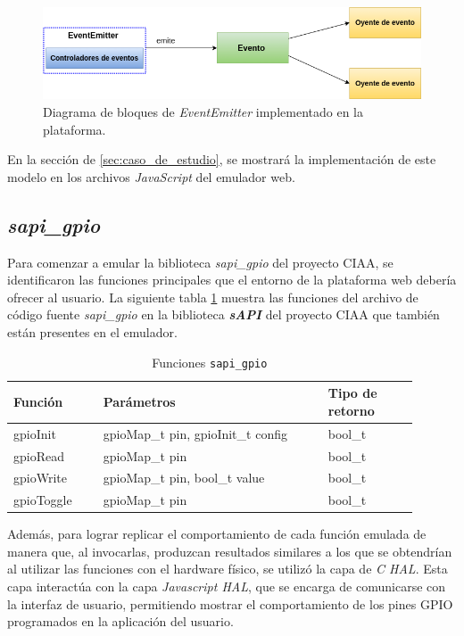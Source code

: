 \begin{figure}[ht]
	\centering
	\includegraphics[scale=.49]{./Figures/EventemitterNodejs.png}
	\caption{Diagrama de bloques de \textit{EventEmitter} implementado en la plataforma.}
	\label{fig:EventemitterNodejs}
\end{figure}

En la sección de \ref{sec:caso_de_estudio}, se mostrará la implementación de este modelo en los archivos \textit{JavaScript} del emulador web.

\subsection{\textit{\textbf{sapi\_gpio}}}

Para comenzar a emular la biblioteca \textit{sapi\_gpio} del proyecto CIAA, se identificaron las funciones principales que el entorno de la plataforma web debería ofrecer al usuario. La siguiente tabla \ref{tab:sapiGPIO} muestra las funciones del archivo de código fuente \textit{sapi\_gpio} en la biblioteca \textit{\textbf{sAPI}} del proyecto CIAA que también están presentes en el emulador.

\begin{table}[h]
	\centering
	\caption[Funciones \texttt{sapi\_gpio}]{Funciones \texttt{sapi\_gpio}}
	\begin{tabular}{p{0.20\linewidth} p{0.50\linewidth}  p{0.20\linewidth}}    
		\toprule
		\textbf{Función} 	 & \textbf{Parámetros} 		& \textbf{Tipo de retorno}  \\
		\midrule
		gpioInit & gpioMap\_t pin, gpioInit\_t config 		&  bool\_t \\		
		gpioRead	 & gpioMap\_t pin			&  bool\_t \\
		gpioWrite	 & gpioMap\_t pin, bool\_t value			& bool\_t \\
		gpioToggle	 & gpioMap\_t pin				&  bool\_t \\
		\bottomrule
		\hline
	\end{tabular}
	\label{tab:sapiGPIO}
\end{table}

Además, para lograr replicar el comportamiento de cada función emulada de manera que, al invocarlas, produzcan resultados similares a los que se obtendrían al utilizar las funciones con el hardware físico, se utilizó la capa de \textit{C HAL}. Esta capa interactúa con la capa \textit{Javascript HAL}, que se encarga de comunicarse con la interfaz de usuario, permitiendo mostrar el comportamiento de los pines GPIO programados en la aplicación del usuario.


